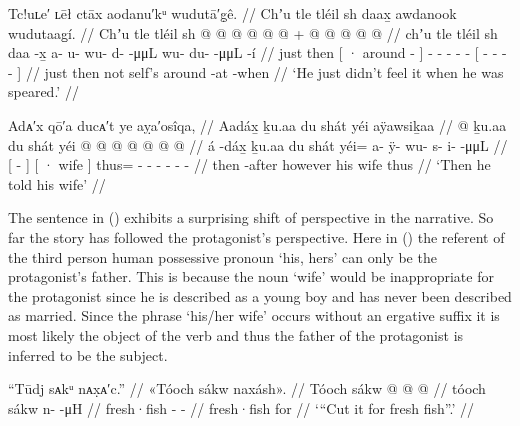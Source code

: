 \ex\label{ex:100-127-didnt-feel-it}%
%
\begingl
	\glpreamble	Tc!uʟe′ ʟēł ctāx aodanu′kᵘ wudutā′g̣ê. //
	\glpreamble	Chʼu tle tléil sh daax̱ awdanook wudutaag̱í. //
	\gla	Chʼu tle tléil
		{} sh  @ {} {} 
		 @ {} @ {} @ {} @ {} @ {} +
		{}  @ {} @ {} @ {} @ {} @ {} //
	\glb	chʼu tle tléil
		{} sh daa -x̱ {}
		a- u- wu- d-  -μμL
		{} wu- du-  -μμL -í {} //
	\glc	just then 
		{}[ · around - {}]
		- - - -  -
		{}[ - -  - - {}] //
	\gld	just then not
		{} self’s around -at {}
		 {} {} {} {} {}
		{}  {} {} {} -when {} //
	\glft	‘He just didn’t feel it when he was speared.’
		//
\endgl
\xe

\ex\label{ex:100-128-didnt-feel-it}%
%
\begingl
	\glpreamble	Adᴀ′x qō′a ducᴀ′t ye aỵa′osîqa, //
	\glpreamble	Aadáx̱ ḵu.aa du shát yéi aÿawsiḵaa //
	\gla	{}  @ {} {} ḵu.aa 
		{} du shát {} 
		yéi @  @ {} @ {} @ {} @ {} @ {} @ {} //
	\glb	{} á -dáx̱ {} ḵu.aa
		{} du shát {} 
		yéi= a- ÿ- wu- s- i-  -μμL //
	\glc	{}[  - {}] 
		{}[ · wife {}]
		thus= - - - - -  - //
	\gld	{} then -after {} however
		{} his wife {} 
		thus\•  {} {} {} {} {} {} {} //
	\glft	‘Then he told his wife’
		//
\endgl
\xe

The sentence in (\lastx) exhibits a surprising shift of perspective in the narrative.
So far the story has followed the protagonist’s perspective.
Here in (\lastx) the referent of the third person human possessive pronoun  ‘his, hers’ can only be the protagonist’s father.
This is because the noun  ‘wife’ would be inappropriate for the protagonist since he is described as a young boy and has never been described as married.
Since the phrase  ‘his/her wife’ occurs without an ergative suffix  it is most likely the object of the verb and thus the father of the protagonist is inferred to be the subject.

\ex\label{ex:100-129-didnt-feel-it}%
%
\begingl
	\glpreamble	“Tūdj sᴀkᵘ nᴀx̣ᴀ′c.” //
	\glpreamble	«\!Tóoch sákw naxásh\!». //
	\gla	{} Tóoch sákw {} 
		 @ {} @ {} @ {} //
	\glb	{} tóoch sákw {} 
		n- {}  -μH //
	\glc	{} fresh·fish  {}
		- \·  - //
	\gld	{} fresh·fish for {}
		 {} {} {} //
	\glft	‘“Cut it for fresh fish”.’
		//
\endgl
\xe

